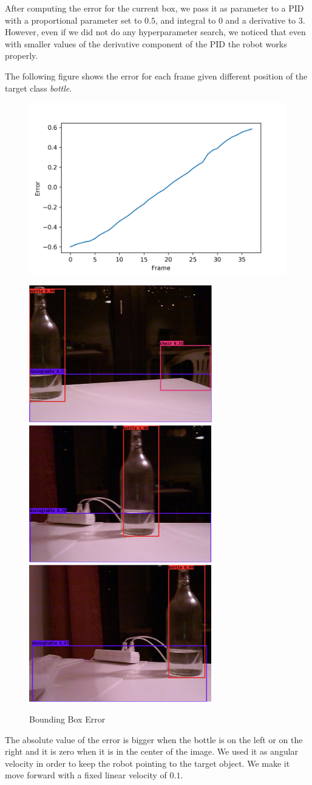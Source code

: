 \documentclass[letterpaper, 10 pt, conference]{ieeeconf}  %
\begin{document}
After computing the error for the current box, we pass it as parameter to a PID with a proportional parameter set to $0.5$, and integral to $0$ and a derivative to $3$. However, even if we did not do any hyperparameter search, we noticed that even with smaller values of the derivative component of the PID the robot works properly. 

The following figure shows the error for each frame given different position of the target class \emph{bottle}.
\begin{figure}[H]
\begin{center}
	\includegraphics[width=\linewidth]{images/frame_error.png}
\end{center}	
\begin{center}
\includegraphics[width=0.31\linewidth]{images/bottle/1}	
\includegraphics[width=0.31\linewidth]{images/bottle/2}	
\includegraphics[width=0.31\linewidth]{images/bottle/3}		
\end{center}
\caption{Bounding Box Error}
\end{figure}
The absolute value of the error is bigger when the bottle is on the left or on the right and it is zero when it is in the center of the image. We used it as angular velocity in order to keep the robot pointing to the target object. We make it move forward with a fixed linear velocity of $0.1$.
\end{document}
